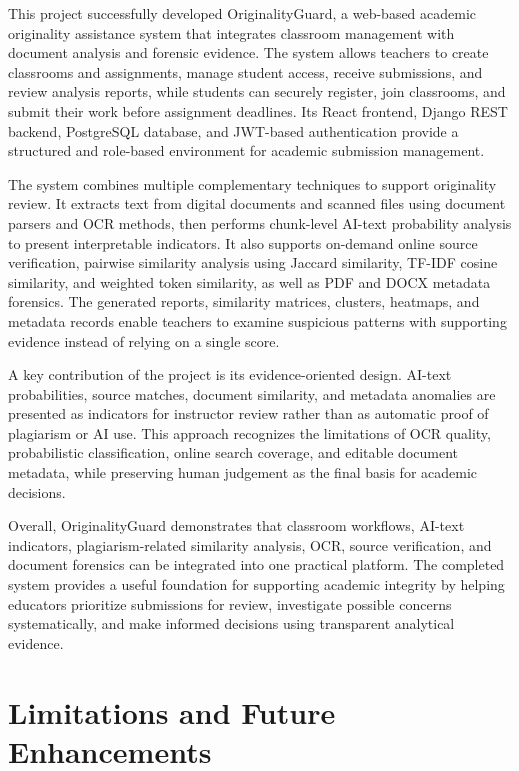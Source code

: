 \documentclass[12pt, a4paper]{report}
\numberwithin{equation}{chapter}
\begin{document}
This project successfully developed OriginalityGuard, a web-based academic originality assistance system that integrates classroom management with document analysis and forensic evidence. The system allows teachers to create classrooms and assignments, manage student access, receive submissions, and review analysis reports, while students can securely register, join classrooms, and submit their work before assignment deadlines. Its React frontend, Django REST backend, PostgreSQL database, and JWT-based authentication provide a structured and role-based environment for academic submission management.

The system combines multiple complementary techniques to support originality review. It extracts text from digital documents and scanned files using document parsers and OCR methods, then performs chunk-level AI-text probability analysis to present interpretable indicators. It also supports on-demand online source verification, pairwise similarity analysis using Jaccard similarity, TF-IDF cosine similarity, and weighted token similarity, as well as PDF and DOCX metadata forensics. The generated reports, similarity matrices, clusters, heatmaps, and metadata records enable teachers to examine suspicious patterns with supporting evidence instead of relying on a single score.

A key contribution of the project is its evidence-oriented design. AI-text probabilities, source matches, document similarity, and metadata anomalies are presented as indicators for instructor review rather than as automatic proof of plagiarism or AI use. This approach recognizes the limitations of OCR quality, probabilistic classification, online search coverage, and editable document metadata, while preserving human judgement as the final basis for academic decisions.

Overall, OriginalityGuard demonstrates that classroom workflows, AI-text indicators, plagiarism-related similarity analysis, OCR, source verification, and document forensics can be integrated into one practical platform. The completed system provides a useful foundation for supporting academic integrity by helping educators prioritize submissions for review, investigate possible concerns systematically, and make informed decisions using transparent analytical evidence.
\chapter{Limitations and Future Enhancements}
\end{document}
